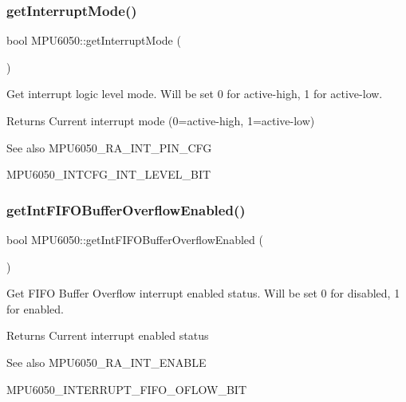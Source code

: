 \subsubsection{\texorpdfstring{getInterruptMode()}{getInterruptMode()}}
{\footnotesize\ttfamily bool M\+P\+U6050\+::get\+Interrupt\+Mode (\begin{DoxyParamCaption}{ }\end{DoxyParamCaption})}

Get interrupt logic level mode. Will be set 0 for active-\/high, 1 for active-\/low. \begin{DoxyReturn}{Returns}
Current interrupt mode (0=active-\/high, 1=active-\/low) 
\end{DoxyReturn}
\begin{DoxySeeAlso}{See also}
M\+P\+U6050\+\_\+\+R\+A\+\_\+\+I\+N\+T\+\_\+\+P\+I\+N\+\_\+\+C\+FG 

M\+P\+U6050\+\_\+\+I\+N\+T\+C\+F\+G\+\_\+\+I\+N\+T\+\_\+\+L\+E\+V\+E\+L\+\_\+\+B\+IT 
\end{DoxySeeAlso}
\mbox{\label{class_m_p_u6050_a55f99c88cc84901f245924ed5e3fe47e}} 
\subsubsection{\texorpdfstring{getIntFIFOBufferOverflowEnabled()}{getIntFIFOBufferOverflowEnabled()}}
{\footnotesize\ttfamily bool M\+P\+U6050\+::get\+Int\+F\+I\+F\+O\+Buffer\+Overflow\+Enabled (\begin{DoxyParamCaption}{ }\end{DoxyParamCaption})}

Get F\+I\+FO Buffer Overflow interrupt enabled status. Will be set 0 for disabled, 1 for enabled. \begin{DoxyReturn}{Returns}
Current interrupt enabled status 
\end{DoxyReturn}
\begin{DoxySeeAlso}{See also}
M\+P\+U6050\+\_\+\+R\+A\+\_\+\+I\+N\+T\+\_\+\+E\+N\+A\+B\+LE 

M\+P\+U6050\+\_\+\+I\+N\+T\+E\+R\+R\+U\+P\+T\+\_\+\+F\+I\+F\+O\+\_\+\+O\+F\+L\+O\+W\+\_\+\+B\+IT 
\end{DoxySeeAlso}
\mbox{\label{class_m_p_u6050_aa31427588f059c69d93ddb00ba257b12}} 
